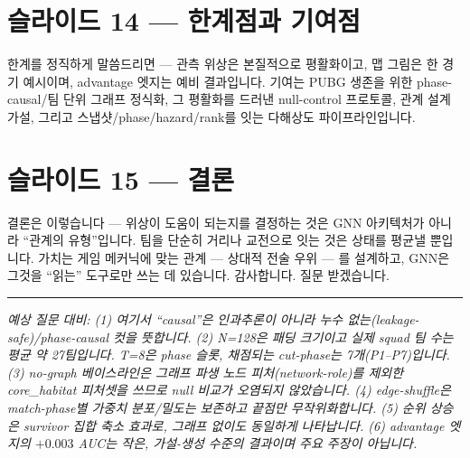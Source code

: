 \documentclass[11pt]{article}
\begin{document}
\section{슬라이드 14 --- 한계점과 기여점}
한계를 정직하게 말씀드리면 --- 관측 위상은 본질적으로 평활화이고, 맵 그림은 한 경기 예시이며, advantage 엣지는 예비 결과입니다. 기여는 PUBG 생존을 위한 phase-causal/팀 단위 그래프 정식화, 그 평활화를 드러낸 null-control 프로토콜, 관계 설계 가설, 그리고 스냅샷/phase/hazard/rank를 잇는 다해상도 파이프라인입니다.

\section{슬라이드 15 --- 결론}
결론은 이렇습니다 --- 위상이 도움이 되는지를 결정하는 것은 GNN 아키텍처가 아니라 ``관계의 유형''입니다. 팀을 단순히 거리나 교전으로 잇는 것은 상태를 평균낼 뿐입니다. 가치는 게임 메커닉에 맞는 관계 --- 상대적 전술 우위 --- 를 설계하고, GNN은 그것을 ``읽는'' 도구로만 쓰는 데 있습니다. 감사합니다. 질문 받겠습니다.

\vspace{1em}\hrule
\vspace{0.4em}
\noindent\small\textit{예상 질문 대비: (1) 여기서 ``causal''은 인과추론이 아니라 누수 없는(leakage-safe)/phase-causal 컷을 뜻합니다. (2) N=128은 패딩 크기이고 실제 squad 팀 수는 평균 약 27팀입니다. T=8은 phase 슬롯, 채점되는 cut-phase는 7개(P1{--}P7)입니다. (3) no-graph 베이스라인은 그래프 파생 노드 피처(network-role)를 제외한 core\_habitat 피처셋을 쓰므로 null 비교가 오염되지 않았습니다. (4) edge-shuffle은 match-phase별 가중치 분포/밀도는 보존하고 끝점만 무작위화합니다. (5) 순위 상승은 survivor 집합 축소 효과로, 그래프 없이도 동일하게 나타납니다. (6) advantage 엣지의 $+0.003$ AUC는 작은, 가설-생성 수준의 결과이며 주요 주장이 아닙니다.}
\end{document}
